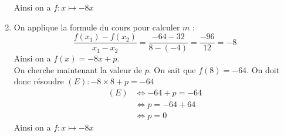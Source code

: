 \documentclass[15pt, mathserif]{beamer}
\begin{document}
\begin{frame}
\begin{multicols}{2}
\begin{enumerate}
 Ainsi on a $f:x\mapsto -8x$ 
 \columnbreak 
 \item 
 \footnotesize{On applique la formule du cours pour calculer $m$ :$$ \dfrac{f(x_1)-f(x_2)}{x_1-x_2}=\dfrac{-64-32}{8-\left(-4\right)}= \dfrac{-96}{12}=-8$$} \footnotesize{ Ainsi on a $f(x)= -8x +p $. 
  \\ On cherche maintenant la valeur de $p$. On sait que $f(8)=-64$. On doit donc résoudre $(E): -8\times8+p=-64$}	 
 \begin{align*} (E)& \Leftrightarrow -64+p=-64\\
		 	 & \Leftrightarrow p=-64+64\\
			 & \Leftrightarrow p=0
	 \end{align*} 
 Ainsi on a $f:x\mapsto -8x$ 
 \end{enumerate} 
 \end{multicols} 
 \end{frame}
\end{document}
